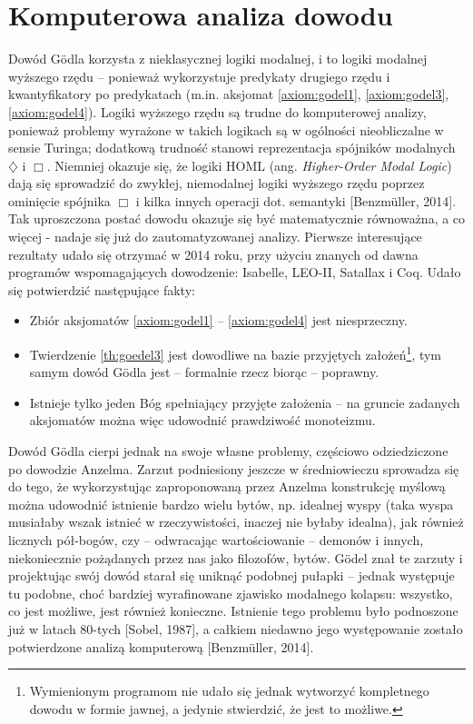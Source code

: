 \documentclass[
    showauthor=true,   %
    showsubject=false, %
    showdate=true,     %
    hyphenation=true   %
]{src/wut-report}
\begin{document}
\section{Komputerowa analiza dowodu}
Dowód G\"odla korzysta z nieklasycznej logiki modalnej, i to logiki modalnej wyższego rzędu -- ponieważ wykorzystuje predykaty drugiego rzędu i kwantyfikatory po predykatach (m.in. aksjomat \ref{axiom:godel1}, \ref{axiom:godel3}, \ref{axiom:godel4}). Logiki wyższego rzędu są trudne do komputerowej analizy, ponieważ problemy wyrażone w takich logikach są w ogólności nieobliczalne w sensie Turinga; dodatkową trudność stanowi reprezentacja spójników modalnych $\diamondsuit$ i $\Box$. Niemniej okazuje się, że logiki HOML (ang. \textit{Higher-Order Modal Logic}) dają się sprowadzić do zwykłej, niemodalnej logiki wyższego rzędu poprzez ominięcie spójnika $\Box$ i kilka innych operacji dot. semantyki [Benzm\"uller, 2014]. Tak uproszczona postać dowodu okazuje się być matematycznie równoważna, a co więcej - nadaje się już do zautomatyzowanej analizy. Pierwsze interesujące rezultaty udało się otrzymać w 2014 roku, przy użyciu znanych od dawna programów wspomagających dowodzenie: Isabelle, LEO-II, Satallax i Coq. Udało się potwierdzić następujące fakty:
\begin{itemize}
	\item Zbiór aksjomatów \ref{axiom:godel1} -- \ref{axiom:godel4} jest niesprzeczny.
	\item Twierdzenie \ref{th:goedel3} jest dowodliwe na bazie przyjętych założeń\footnote{Wymienionym programom nie udało się jednak wytworzyć kompletnego dowodu w formie jawnej, a jedynie stwierdzić, że jest to możliwe. }, tym samym dowód G\"odla jest -- formalnie rzecz biorąc -- poprawny.
	\item Istnieje tylko jeden Bóg spełniający przyjęte założenia -- na  gruncie zadanych aksjomatów można więc udowodnić prawdziwość monoteizmu.
\end{itemize}

Dowód G\"odla cierpi jednak na swoje własne problemy, częściowo odziedziczone po dowodzie Anzelma. Zarzut podniesiony jeszcze w średniowieczu sprowadza się do tego, że wykorzystując zaproponowaną przez Anzelma konstrukcję myślową można udowodnić istnienie bardzo wielu bytów, np. idealnej wyspy (taka wyspa musiałaby wszak istnieć w rzeczywistości, inaczej nie byłaby idealna), jak również licznych pół-bogów, czy -- odwracając wartościowanie -- demonów i innych, niekoniecznie pożądanych przez nas jako filozofów, bytów. G\"odel znał te zarzuty i projektując swój dowód starał się uniknąć podobnej pułapki -- jednak występuje tu podobne, choć bardziej wyrafinowane zjawisko modalnego kolapsu: wszystko, co jest możliwe, jest również konieczne. Istnienie tego problemu było podnoszone już w latach 80-tych [Sobel, 1987], a całkiem niedawno jego występowanie zostało potwierdzone analizą komputerową [Benzm\"uller, 2014].
\end{document}
